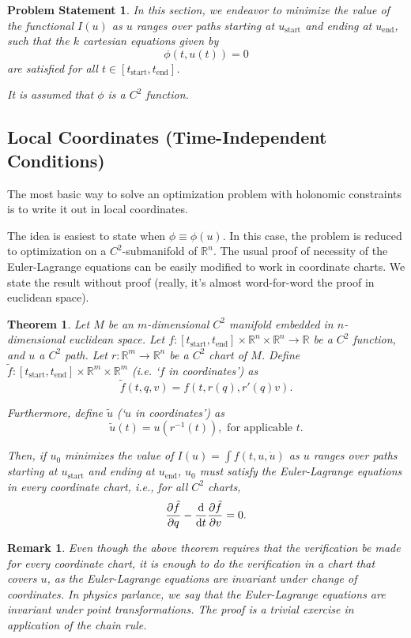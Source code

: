 \documentclass{article}
\theoremstyle{plain}
\newtheorem{theorem}{Theorem}
\theoremstyle{plain}
\newtheorem{remark}{Remark}
\theoremstyle{nonumberplain}
\newtheorem{statement}{Problem Statement}
\theoremstyle{empty}
\newcommand{\R}{\mathbb{R}}
\newcommand{\tstart}{\mathrm{start}}
\newcommand{\tend}{\mathrm{end}}
\begin{document}
\begin{statement}
In this section, we endeavor to minimize the value of the functional $I(u)$ as $u$ ranges over paths starting at $u_\tstart$ and ending at $u_\tend$, such that the $k$ cartesian equations given by
\[\phi(t, u(t)) = 0\]
are satisfied for all $t \in [t_\tstart, t_\tend]$.

It is assumed that $\phi$ is a $C^2$ function.
\end{statement}

\subsection{Local Coordinates (Time-Independent Conditions)}

The most basic way to solve an optimization problem with holonomic constraints is to write it out in local coordinates.

The idea is easiest to state when $\phi \equiv \phi(u)$. In this case, the problem is reduced to optimization on a $C^2$-submanifold of $\R^n$. The usual proof of necessity of the Euler-Lagrange equations can be easily modified to work in coordinate charts. We state the result without proof (really, it's almost word-for-word the proof in euclidean space).

\begin{theorem}\label{elinmanifolds}
Let $M$ be an $m$-dimensional $C^2$ manifold embedded in $n$-dimensional euclidean space. Let $f : [t_\tstart, t_\tend] \times \R^n \times \R^n \to \R$ be a $C^2$ function, and $u$ a $C^2$ path. Let $r : \R^m \to \R^n$ be a $C^2$ chart of $M$. Define $\tilde f : [t_\tstart, t_\tend] \times \R^m \times \R^m$ (i.e. `$f$ in coordinates') as
\[ \tilde f(t, q, v) = f(t, r(q), r'(q)v).\]

Furthermore, define $\tilde u$ (`$u$ in coordinates') as
\[\tilde u(t) = u(r^{-1}(t)), \text{ for applicable $t$.}\]

Then, if $u_0$ minimizes the value of $I(u) = \int f(t,u,\dot u)$ as $u$ ranges over paths starting at $u_\tstart$ and ending at $u_\tend$, $u_0$ must satisfy the Euler-Lagrange equations in every coordinate chart, i.e., for all $C^2$ charts,
\[\diffp{\tilde f} q - \diff*{\diffp{\tilde f}v}t = 0.\]
\end{theorem}

\begin{remark}
Even though the above theorem requires that the verification be made for every coordinate chart, it is enough to do the verification in a chart that covers $u$, as the Euler-Lagrange equations are invariant under change of coordinates. In physics parlance, we say that the Euler-Lagrange equations are invariant under point transformations. The proof is a trivial exercise in application of the chain rule.
\end{remark}
\end{document}
